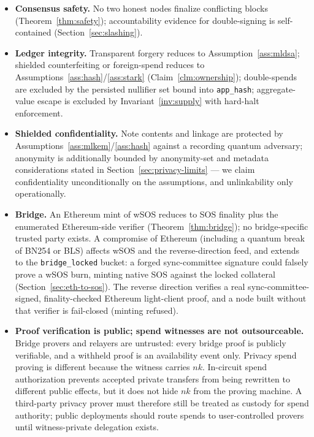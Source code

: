 \documentclass[11pt]{article}
\newcommand{\code}[1]{\texttt{#1}}
\theoremstyle{plain}
\theoremstyle{definition}
\theoremstyle{remark}
\begin{document}
\begin{itemize}[leftmargin=1.6em]
\item \textbf{Consensus safety.} No two honest nodes finalize conflicting
  blocks (Theorem~\ref{thm:safety}); accountability evidence for
  double-signing is self-contained (Section~\ref{sec:slashing}).
\item \textbf{Ledger integrity.} Transparent forgery reduces to
  Assumption~\ref{ass:mldsa}; shielded counterfeiting or foreign-spend
  reduces to Assumptions~\ref{ass:hash}/\ref{ass:stark}
  (Claim~\ref{clm:ownership}); double-spends are excluded by the persisted
  nullifier set bound into \code{app\_hash}; aggregate-value escape is
  excluded by Invariant~\ref{inv:supply} with hard-halt enforcement.
\item \textbf{Shielded confidentiality.} Note contents and linkage are
  protected by Assumptions~\ref{ass:mlkem}/\ref{ass:hash} against a
  recording quantum adversary; anonymity is additionally bounded by
  anonymity-set and metadata considerations stated in
  Section~\ref{sec:privacy-limits} --- we claim confidentiality
  unconditionally on the assumptions, and unlinkability only operationally.
\item \textbf{Bridge.} An Ethereum mint of wSOS reduces to SOS finality plus
  the enumerated Ethereum-side verifier (Theorem~\ref{thm:bridge}); no
  bridge-specific trusted party exists. A compromise of Ethereum (including
  a quantum break of BN254 or BLS) affects wSOS and the reverse-direction
  feed, and extends to the \code{bridge\_locked} bucket: a forged
  sync-committee signature could falsely prove a wSOS burn, minting native SOS
  against the locked collateral (Section~\ref{sec:eth-to-sos}). The reverse
  direction verifies a real sync-committee-signed, finality-checked
  Ethereum light-client proof, and a node built without that verifier is
  fail-closed (minting refused).
\item \textbf{Proof verification is public; spend witnesses are not
  outsourceable.} Bridge provers and relayers are untrusted: every bridge
  proof is publicly verifiable, and a withheld proof is an availability event
  only. Privacy spend proving is different because the witness carries
  $\mathit{nk}$. In-circuit spend authorization prevents accepted private
  transfers from being rewritten to different public effects, but it does not
  hide $\mathit{nk}$ from the proving machine. A third-party privacy prover
  must therefore still be treated as custody for spend authority; public
  deployments should route spends to user-controlled provers until
  witness-private delegation exists.
\end{itemize}
\end{document}
